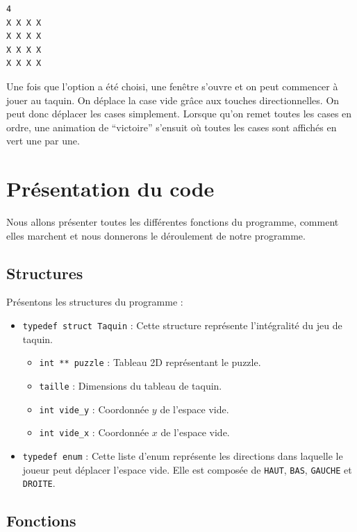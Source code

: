 \documentclass[11pt]{article}
\begin{document}
\begin{verbatim}
4
X X X X
X X X X
X X X X
X X X X
\end{verbatim}

Une fois que l'option a été choisi, une fenêtre s'ouvre et on peut commencer à jouer au taquin. On déplace la case vide grâce aux touches directionnelles. On peut donc déplacer les cases simplement. Lorsque qu'on remet toutes les cases en ordre, une animation de ``victoire'' s'ensuit où toutes les cases sont affichés en vert une par une.

\section{Présentation du code}
\label{sec:org96935f3}

Nous allons présenter toutes les différentes fonctions du programme, comment elles marchent et nous donnerons le déroulement de notre programme.

\subsection{Structures}
\label{sec:orga16eb1c}

Présentons les structures du programme :

\begin{itemize}
\item \texttt{typedef struct Taquin} : Cette structure représente l'intégralité du jeu de taquin.
\begin{itemize}
\item \texttt{int ** puzzle} : Tableau 2D représentant le puzzle.
\item \texttt{taille} : Dimensions du tableau de taquin.
\item \texttt{int vide\_y} : Coordonnée \(y\) de l'espace vide.
\item \texttt{int vide\_x} : Coordonnée \(x\) de l'espace vide.
\end{itemize}
\item \texttt{typedef enum} : Cette liste d'enum représente les directions dans laquelle le joueur peut déplacer l'espace vide. Elle est composée de \texttt{HAUT}, \texttt{BAS}, \texttt{GAUCHE} et \texttt{DROITE}.
\end{itemize}

\subsection{Fonctions}
\label{sec:org699c8c3}
\end{document}
